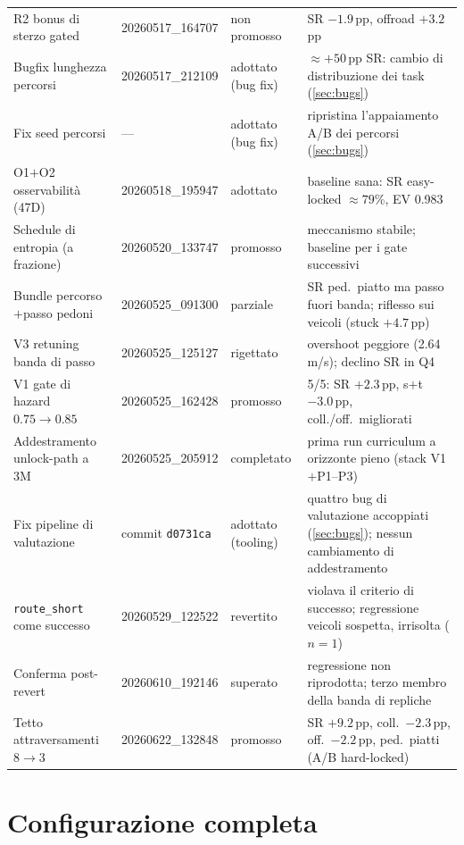\begin{small}
\begin{longtable}{@{}p{3.1cm}p{2.8cm}p{2.0cm}p{5.6cm}@{}}
  R2 bonus di sterzo gated & 20260517\_164707 & non promosso & SR $-1.9$\,pp, offroad $+3.2$\,pp \\
  Bugfix lunghezza percorsi & 20260517\_212109 & adottato (bug fix) & $\approx +50$\,pp SR: cambio di distribuzione dei task (\cref{sec:bugs}) \\
  Fix seed percorsi & --- & adottato (bug fix) & ripristina l'appaiamento A/B dei percorsi (\cref{sec:bugs}) \\
  O1$+$O2 osservabilità (47D) & 20260518\_195947 & adottato & baseline sana: SR easy-locked $\approx 79$\%, EV 0.983 \\
  Schedule di entropia (a frazione) & 20260520\_133747 & promosso & meccanismo stabile; baseline per i gate successivi \\
  Bundle percorso$+$passo pedoni & 20260525\_091300 & parziale & SR ped.\ piatto ma passo fuori banda; riflesso sui veicoli (stuck $+4.7$\,pp) \\
  V3 retuning banda di passo & 20260525\_125127 & rigettato & overshoot peggiore (2.64\,m/s); declino SR in Q4 \\
  V1 gate di hazard $0.75 \to 0.85$ & 20260525\_162428 & promosso & 5/5: SR $+2.3$\,pp, s$+$t $-3.0$\,pp, coll./off.\ migliorati \\
  Addestramento unlock-path a 3M & 20260525\_205912 & completato & prima run curriculum a orizzonte pieno (stack V1$+$P1--P3) \\
  Fix pipeline di valutazione & commit \texttt{d0731ca} & adottato (tooling) & quattro bug di valutazione accoppiati (\cref{sec:bugs}); nessun cambiamento di addestramento \\
  \texttt{route\_short} come successo & 20260529\_122522 & revertito & violava il criterio di successo; regressione veicoli sospetta, irrisolta ($n=1$) \\
  Conferma post-revert & 20260610\_192146 & superato & regressione non riprodotta; terzo membro della banda di repliche \\
  Tetto attraversamenti $8 \to 3$ & 20260622\_132848 & promosso & SR $+9.2$\,pp, coll.\ $-2.3$\,pp, off.\ $-2.2$\,pp, ped.\ piatti (A/B hard-locked) \\
  \bottomrule
\end{longtable}
\end{small}

\chapter{Configurazione completa}
\label{app:hyperparams}

